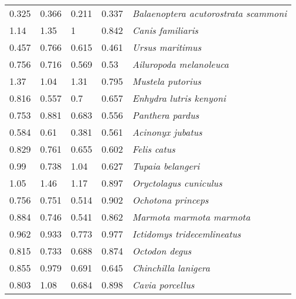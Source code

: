 \begin{tabular}{lllll}
          0.325 &           0.366 &           0.211 &           0.337 &  \textit{Balaenoptera acutorostrata scammoni} \\
           1.14 &            1.35 &               1 &           0.842 &                     \textit{Canis familiaris} \\
          0.457 &           0.766 &           0.615 &           0.461 &                      \textit{Ursus maritimus} \\
          0.756 &           0.716 &           0.569 &            0.53 &               \textit{Ailuropoda melanoleuca} \\
           1.37 &            1.04 &            1.31 &           0.795 &                     \textit{Mustela putorius} \\
          0.816 &           0.557 &             0.7 &           0.657 &               \textit{Enhydra lutris kenyoni} \\
          0.753 &           0.881 &           0.683 &           0.556 &                      \textit{Panthera pardus} \\
          0.584 &            0.61 &           0.381 &           0.561 &                     \textit{Acinonyx jubatus} \\
          0.829 &           0.761 &           0.655 &           0.602 &                          \textit{Felis catus} \\
           0.99 &           0.738 &            1.04 &           0.627 &                     \textit{Tupaia belangeri} \\
           1.05 &            1.46 &            1.17 &           0.897 &                \textit{Oryctolagus cuniculus} \\
          0.756 &           0.751 &           0.514 &           0.902 &                    \textit{Ochotona princeps} \\
          0.884 &           0.746 &           0.541 &           0.862 &              \textit{Marmota marmota marmota} \\
          0.962 &           0.933 &           0.773 &           0.977 &           \textit{Ictidomys tridecemlineatus} \\
          0.815 &           0.733 &           0.688 &           0.874 &                        \textit{Octodon degus} \\
          0.855 &           0.979 &           0.691 &           0.645 &                  \textit{Chinchilla lanigera} \\
          0.803 &            1.08 &           0.684 &           0.898 &                      \textit{Cavia porcellus} \\

\end{tabular}
